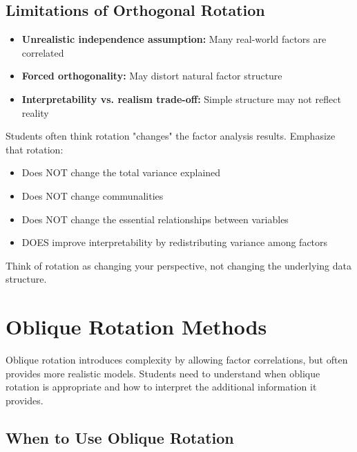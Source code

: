 \documentclass[a4paper]{tufte-book}
\begin{document}
\section{Limitations of Orthogonal Rotation}

\begin{itemize}
\item \textbf{Unrealistic independence assumption:} Many real-world factors are correlated
\item \textbf{Forced orthogonality:} May distort natural factor structure
\item \textbf{Interpretability vs. realism trade-off:} Simple structure may not reflect reality
\end{itemize}

\begin{commonmistake}
Students often think rotation "changes" the factor analysis results. Emphasize that rotation:
\begin{itemize}
\item Does NOT change the total variance explained
\item Does NOT change communalities
\item Does NOT change the essential relationships between variables
\item DOES improve interpretability by redistributing variance among factors
\end{itemize}

Think of rotation as changing your perspective, not changing the underlying data structure.
\end{commonmistake}


\chapter{Oblique Rotation Methods}

\begin{pedagogicalnote}
Oblique rotation introduces complexity by allowing factor correlations, but often provides more realistic models. Students need to understand when oblique rotation is appropriate and how to interpret the additional information it provides.
\end{pedagogicalnote}

\section{When to Use Oblique Rotation}
\end{document}
